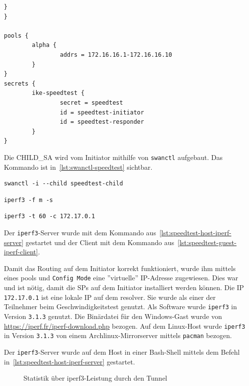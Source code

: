 {\begin{lstlisting}[label=lst:speedtest-responder-config,caption=Responder-Konfiguration für den Geschwindigkeitstest]
        }
}

pools {
        alpha {
                addrs = 172.16.16.1-172.16.16.10
        }
}
secrets {
        ike-speedtest {
                secret = speedtest
                id = speedtest-initiator
                id = speedtest-responder
        }
}
\end{lstlisting}

Die CHILD\_SA wird vom Initiator mithilfe von \texttt{swanctl} aufgebaut. Das Kommando
ist in~\autoref{lst:swanctl-speedtest} sichtbar.
\begin{lstlisting}[label=lst:swanctl-speedtest,caption=Kommando für den Tunnelaufbau des Geschwindigkeitstests]
swanctl -i --child speedtest-child
\end{lstlisting}

\begin{lstlisting}[label=lst:speedtest-host-iperf-server,caption=Kommando für den Start des iperf-Servers]
iperf3 -f m -s 
\end{lstlisting}

\begin{lstlisting}[label=lst:speedtest-guest-iperf-client,caption=Kommando für den Start des iperf-Clients]
iperf3 -t 60 -c 172.17.0.1
\end{lstlisting}
Der \texttt{iperf3}-Server wurde mit dem Kommando aus~\autoref{lst:speedtest-host-iperf-server}
gestartet und der Client mit dem Kommando aus~\autoref{lst:speedtest-guest-iperf-client}.


Damit das Routing auf dem Initiator korrekt funktioniert, wurde ihm mittels eines pools
und \texttt{Config Mode} eine ''virtuelle'' \ac{IP}-Adresse zugewiesen. Dies war und ist
nötig, damit die \acp{SP} auf dem Initiator installiert werden können.
Die IP \texttt{172.17.0.1} ist eine lokale IP auf dem resolver. Sie wurde als
einer der Teilnehmer beim Geschwindigkeitstest genutzt. 
Als Software wurde \texttt{iperf3} in Version \texttt{3.1.3} genutzt.
Die Binärdatei für den Windows-Gast wurde von \url{https://iperf.fr/iperf-download.php} bezogen.
Auf dem Linux-Host wurde \texttt{iperf3} in Version \texttt{3.1.3} von einem Archlinux-Mirrorserver mittels
\texttt{pacman} bezogen.

Der \texttt{iperf3}-Server wurde auf dem Host in einer Bash-Shell mittels
dem Befehl in~\autoref{lst:speedtest-host-iperf-server} gestartet.
\begin{figure}[h!]
\caption{Statistik über iperf3-Leistung durch den Tunnel}
\end{figure}}
